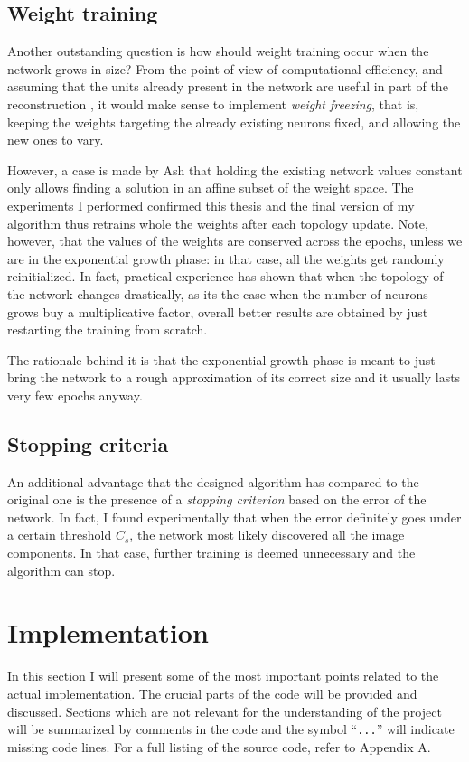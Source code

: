 \documentclass[11pt,a4paper]{report}
\newcommand{\quot}[1]{``#1''}
\begin{document}
			\subsection{Weight training}
				\label{sec:weight}
				Another outstanding question is how should weight training occur when the network grows in size? From the point of view of computational efficiency, and assuming that the units already present in the network are useful in part of the reconstruction \cite{kwok1997objective}, it would make sense to implement \emph{weight freezing}, that is, keeping the weights targeting the already existing neurons fixed, and allowing the new ones to vary.
				
				However, a case is made by Ash \cite{ash1989dynamic} that holding the existing network values constant only allows finding a solution in an affine subset of the weight space. The experiments I performed confirmed this thesis and the final version of my algorithm thus retrains whole the weights after each topology update. Note, however, that the values of the weights are conserved across the epochs, unless we are in the exponential growth phase: in that case, all the weights get randomly reinitialized. In fact, practical experience has shown that when the topology of the network changes drastically, as its the case when the number of neurons grows buy a multiplicative factor, overall better results are obtained by just restarting the training from scratch.
				
				The rationale behind it is that the exponential growth phase is meant to just bring the network to a rough approximation of its correct size and it usually lasts very few epochs anyway.
			
			\subsection{Stopping criteria}
				\label{sec:stopping}
				An additional advantage that the designed algorithm has compared to the original one is the presence of a \emph{stopping criterion} based on the error of the network. In fact, I found experimentally that when the error definitely goes under a certain threshold $C_s$, the network most likely discovered all the image components. In that case, further training is deemed unnecessary and the algorithm can stop.
			
		\section{Implementation}
			In this section I will present some of the most important points related to the actual implementation. The crucial parts of the code will be provided and discussed. Sections which are not relevant for the understanding of the project will be summarized by comments in the code and the symbol \quot{\texttt{...}} will indicate missing code lines. For a full listing of the source code, refer to Appendix A.
			
\end{document}
